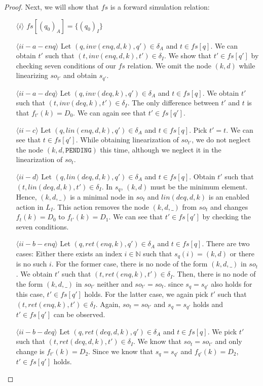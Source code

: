\begin{proof}
Next, we will show that $fs$ is a forward simulation relation:
\begin{itemize}
\item[$\langle i \rangle$] $fs[(q_0)_A] = \{(q_0)_I\}$
\item[$\langle ii-a-enq \rangle$] Let $(q,inv(enq,d,k),q') \in \delta_A$ and $t \in fs[q]$. We can obtain $t'$ such that $(t,inv(enq,d,k),t') \in \delta_I$. We show that $t' \in fs[q']$ by checking seven conditions of our $fs$ relation. We omit the node $(k,d)$ while linearizing $so_{t'}$ and obtain $s_{q'}$.
\item[$\langle ii-a-deq \rangle$] Let $(q, inv(deq,k), q') \in \delta_A$ and $t \in fs[q]$. We obtain $t'$ such that $(t, inv(deq,k),t') \in \delta_I$. The only difference between $t'$ and $t$ is that $f_{t'}(k) = D_0$. We can again see that $t' \in fs[q']$. 
\item[$\langle ii-c \rangle$] Let $(q,lin(enq,d,k),q') \in \delta_A$ and $t \in fs[q]$. Pick $t' = t$. We can see that $t \in fs[q']$. While obtaining linearization of $so_{t'}$, we do not neglect the node $(k,d, \texttt{PENDING})$ this time, although we neglect it in the linearization of $so_t$.
\item[$\langle ii-d \rangle$] Let $(q, lin(deq,d,k), q') \in \delta_A$ and $t \in fs[q]$. Obtain $t'$ such that $(t, lin(deq,d,k), t') \in \delta_I$. In $s_q$, $(k,d)$ must be the minimum element. Hence, $(k,d,\_)$ is a minimal node in $so_t$ and $lin(deq,d,k)$ is an enabled action in $L_I$. This action removes the node $(k,d,\_)$ from $so_t$ and changes $f_t(k)=D_0$ to $f_{t'}(k)= D_1$. We can see that $t' \in fs[q']$ by checking the seven conditions.
\item[$\langle ii-b-enq \rangle$] Let $(q, ret(enq,k), q') \in \delta_A$ and $t \in fs[q]$. There are two cases: Either there exists an index $i \in \mathbb{N}$ such that $s_q(i) = (k,d)$ or there is no such $i$. For the former case, there is no node of the form $(k,d,\_)$ in $so_t$. We obtain $t'$ such that $(t,ret(enq,k),t') \in \delta_I$. Then, there is no node of the form $(k,d,\_)$ in $so_{t'}$ neither and $so_{t'} = so_t$. since $s_q = s_{q'}$ also holds for this case, $t' \in fs[q']$ holds. For the latter case, we again pick $t'$ such that $(t, ret(enq,k), t') \in \delta_I$. Again, $so_t = so_{t'}$ and $s_q = s_{q'}$ holds and $t' \in fs[q']$ can be observed.
\item[$\langle ii-b-deq \rangle$] Let $(q, ret(deq,d,k), q') \in \delta_A$ and $t \in fs[q]$. We pick $t'$ such that $(t, ret(deq,d,k), t') \in \delta_I$. We know that $so_t = so_{t'}$ and only change is $f_{t'}(k) = D_2$. Since we know that $s_q = s_{q'}$ and $f_{q'}(k) = D_2$, $t' \in fs[q']$ holds.  
\end{itemize}
\end{proof}

